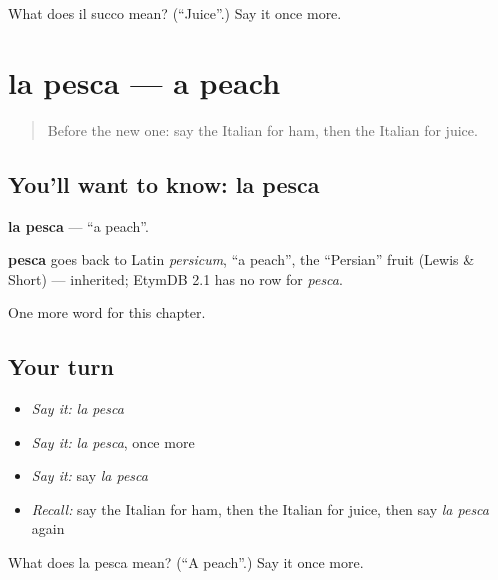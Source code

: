 \begin{tcolorbox}[breakable,colback=teal!4,colframe=teal!35!black,title={Before you move on}]
What does il succo mean? (\textquotedblleft{}Juice\textquotedblright{}.) Say it once more.
\end{tcolorbox}
\section[la pesca]{la pesca — a peach}

\label{lesson:IT-C110-pesca}



\begin{quote}
Before the new one: say the Italian for ham, then the Italian for juice.
\end{quote}

\subsection*{You'll want to know: la pesca}
\textbf{la pesca} — \textquotedblleft{}a peach\textquotedblright{}.

\begin{cousinweb}
\textbf{pesca} goes back to Latin \emph{persicum}, \textquotedblleft{}a peach\textquotedblright{}, the \textquotedblleft{}Persian\textquotedblright{} fruit (Lewis \& Short) — inherited; EtymDB 2.1 has no row for \emph{pesca}.
\end{cousinweb}

\begin{grammarlens}[title={What you've built}]
One more word for this chapter.
\end{grammarlens}

\subsection*{Your turn}
\begin{itemize}
\raggedright
  \item \emph{Say it:} \emph{la pesca}
  \item \emph{Say it:} \emph{la pesca}, once more
  \item \emph{Say it:} say \emph{la pesca}
  \item \emph{Recall:} say the Italian for ham, then the Italian for juice, then say \emph{la pesca} again
\end{itemize}

\begin{tcolorbox}[breakable,colback=teal!4,colframe=teal!35!black,title={Before you move on}]
What does la pesca mean? (\textquotedblleft{}A peach\textquotedblright{}.) Say it once more.
\end{tcolorbox}

